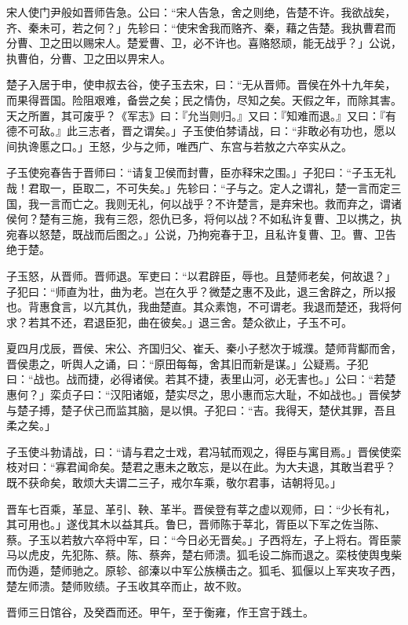 \documentclass[]{article}
\begin{document}
宋人使门尹般如晋师告急。公曰：``宋人告急，舍之则绝，告楚不许。我欲战矣，齐、秦未可，若之何？」先轸曰：``使宋舍我而赂齐、秦，藉之告楚。我执曹君而分曹、卫之田以赐宋人。楚爱曹、卫，必不许也。喜赂怒顽，能无战乎？」公说，执曹伯，分曹、卫之田以畀宋人。

楚子入居于申，使申叔去谷，使子玉去宋，曰：``无从晋师。晋侯在外十九年矣，而果得晋国。险阻艰难，备尝之矣；民之情伪，尽知之矣。天假之年，而除其害。天之所置，其可废乎？《军志》曰：『允当则归。』又曰：『知难而退。』又曰：『有德不可敌。』此三志者，晋之谓矣。」子玉使伯棼请战，曰：``非敢必有功也，愿以间执谗慝之口。」王怒，少与之师，唯西广、东宫与若敖之六卒实从之。

子玉使宛春告于晋师曰：``请复卫侯而封曹，臣亦释宋之围。」子犯曰：``子玉无礼哉！君取一，臣取二，不可失矣。」先轸曰：``子与之。定人之谓礼，楚一言而定三国，我一言而亡之。我则无礼，何以战乎？不许楚言，是弃宋也。救而弃之，谓诸侯何？楚有三施，我有三怨，怨仇已多，将何以战？不如私许复曹、卫以携之，执宛春以怒楚，既战而后图之。」公说，乃拘宛春于卫，且私许复曹、卫。曹、卫告绝于楚。

子玉怒，从晋师。晋师退。军吏曰：``以君辟臣，辱也。且楚师老矣，何故退？」子犯曰：``师直为壮，曲为老。岂在久乎？微楚之惠不及此，退三舍辟之，所以报也。背惠食言，以亢其仇，我曲楚直。其众素饱，不可谓老。我退而楚还，我将何求？若其不还，君退臣犯，曲在彼矣。」退三舍。楚众欲止，子玉不可。

夏四月戊辰，晋侯、宋公、齐国归父、崔夭、秦小子憖次于城濮。楚师背酅而舍，晋侯患之，听舆人之诵，曰：``原田每每，舍其旧而新是谋。」公疑焉。子犯曰：``战也。战而捷，必得诸侯。若其不捷，表里山河，必无害也。」公曰：``若楚惠何？」栾贞子曰：``汉阳诸姬，楚实尽之，思小惠而忘大耻，不如战也。」晋侯梦与楚子搏，楚子伏己而监其脑，是以惧。子犯曰：``吉。我得天，楚伏其罪，吾且柔之矣。」

子玉使斗勃请战，曰：``请与君之士戏，君冯轼而观之，得臣与寓目焉。」晋侯使栾枝对曰：``寡君闻命矣。楚君之惠未之敢忘，是以在此。为大夫退，其敢当君乎？既不获命矣，敢烦大夫谓二三子，戒尔车乘，敬尔君事，诘朝将见。」

晋车七百乘，革显、革引、鞅、革半。晋侯登有莘之虚以观师，曰：``少长有礼，其可用也。」遂伐其木以益其兵。鲁巳，晋师陈于莘北，胥臣以下军之佐当陈、蔡。子玉以若敖六卒将中军，曰：``今日必无晋矣。」子西将左，子上将右。胥臣蒙马以虎皮，先犯陈、蔡。陈、蔡奔，楚右师溃。狐毛设二旆而退之。栾枝使舆曳柴而伪遁，楚师驰之。原轸、郤溱以中军公族横击之。狐毛、狐偃以上军夹攻子西，楚左师溃。楚师败绩。子玉收其卒而止，故不败。

晋师三日馆谷，及癸酉而还。甲午，至于衡雍，作王宫于践土。
\end{document}
